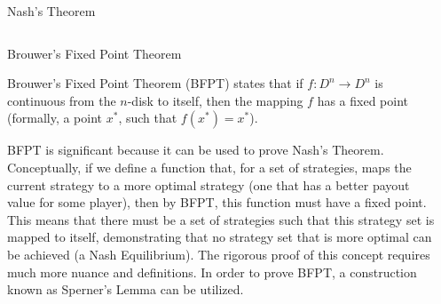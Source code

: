 \documentclass[final]{beamer}
\newlength{\onecolwid}
\newlength{\twocolwid}
\begin{document}
\begin{frame}[t]
\begin{columns}[t]
\begin{column}{\twocolwid}
\begin{alertblock}{Nash's Theorem}
\end{alertblock} 


\begin{columns}[t,totalwidth=\twocolwid] %

\begin{column}{\onecolwid} %


\begin{block}{Brouwer's Fixed Point Theorem}

Brouwer's Fixed Point Theorem (BFPT) states that if $f : D^{n} \rightarrow D^{n}$ is continuous from the $n$-disk to itself, then the mapping $f$ has a fixed point (formally, a point $x^{*}$, such that $f(x^{*}) = x^{*}$). \newline 

BFPT is significant because it can be used to prove Nash's Theorem. Conceptually, if we define a function that, for a set of strategies, maps the current strategy to a more optimal strategy (one that has a better payout value for some player), then by BFPT, this function must have a fixed point. This means that there must be a set of strategies such that this strategy set is mapped to itself, demonstrating that no strategy set that is more optimal can be achieved (a Nash Equilibrium). The rigorous proof of this concept requires much more nuance and definitions. In order to prove BFPT, a construction known as Sperner's Lemma can be utilized.



\end{block}


\end{column} %

\begin{column}{\onecolwid} %



\end{column}
\end{columns}
\end{column}
\end{columns}
\end{frame}
\end{document}
